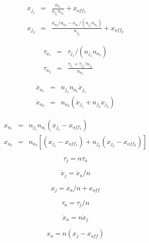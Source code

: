 \documentclass{article}
\begin{document}
\begin{eqnarray*} x_{j_1} & = & \frac{ x_{a_1} }{ n_{j_1} n_{a_1} } + x_{off_1} \\ x_{j_2} & = & \frac{ x_{a_2} / n_{a_2} - x_{a_1} / (n_{j_1} n_{a_1}) }{ n_{j_2} } + x_{off_2} \end{eqnarray*}
\pagebreak

\begin{eqnarray*} \tau_{a_1} & = & \tau_{j_1} / (n_{j_1} n_{a_1}) \\ \tau_{a_2} & = & \frac{ \tau_{j_1} + \tau_{j_2} / n_{j_2} }{ n_{a_2} } \end{eqnarray*}
\pagebreak

\begin{eqnarray*} \dot{x}_{a_1} & = & n_{j_1} n_{a_1} \dot{x}_{j_1} \\ \dot{x}_{a_2} & = & n_{a_2} (\dot{x}_{j_1} + n_{j_2} \dot{x}_{j_2}) \end{eqnarray*}
\pagebreak

\begin{eqnarray*} x_{a_1} & = & n_{j_1} n_{a_1} (x_{j_1} - x_{off_1}) \\ x_{a_2} & = & n_{a_2} \left[(x_{j_1} - x_{off_1}) + n_{j_2} (x_{j_2} - x_{off_2})\right] \end{eqnarray*}
\pagebreak

\[ \tau_j = n \tau_a \]
\pagebreak

\[ \dot{x}_j = \dot{x}_a / n \]
\pagebreak

\[ x_j = x_a / n + x_{off} \]
\pagebreak

\[ \tau_a = \tau_j / n\]
\pagebreak

\[ \dot{x}_a = n \dot{x}_j \]
\pagebreak

\[ x_a = n (x_j - x_{off}) \]
\pagebreak
\end{document}
